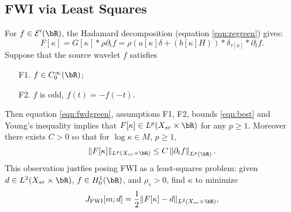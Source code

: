 
\subsection{FWI via Least Squares}
For $f \in {\cal E}'(\bR)$, the Hadamard decomposition 
(equation \ref{eqn:regreen}) gives:
\begin{equation}
  \label{eqn:fwdgreen}
  F[\kappa] = G[\kappa] * \rho \partial_t f  = \rho( a[\kappa]\delta
  +  (b[\kappa]H)) *\delta_{\tau[\kappa]}*\partial_t f.
\end{equation}
Suppose that the source wavelet $f$ satisfies
\begin{itemize}
\item[F1. ] $f \in C^{\infty}_0(\bR)$;
\item[F2. ] $f$ is odd, $f(t) = -f(-t)$.
\end{itemize}
Then equation \ref{eqn:fwdgreen}, assumptions F1, F2, bounds
\ref{eqn:best} and Young's inequality implies that $F[\kappa] \in
L^p(X_{sr} \times \bR)$ for any $p \ge 1$. Moreover there exists
$C>0$ so that for $\log \kappa\in M$, $p \ge 1$,
\begin{equation}
  \label{eqn:fwdnorm}
  \|F[\kappa]\|_{L^p(X_{sr} \times \bR)} \le C \left\|\partial_t f\right\|_{L^p(\bR)}.
\end{equation}
This observation justfies posing FWI as a least-squares problem: given $d \in
L^2(X_{sr}\times \bR)$, $f \in H^1_0(\bR)$, and $\rho_s>0$, find $\kappa$ to minimize
\begin{equation}
  \label{eqn:fwi}
  J_{\rm FWI}[m;d]= \frac{1}{2}\|F[\kappa]-d\|_{L^2(X_{sr} \times \bR)},
\end{equation}

